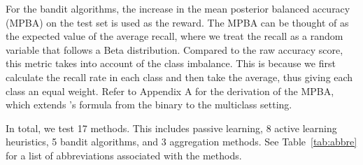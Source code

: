 \documentclass[fleqn,10pt,lineno]{wlpeerj} %
\begin{document}
For the bandit algorithms, the increase in the mean posterior balanced accuracy
(MPBA) on the test set is used as the reward. The MPBA can be thought of as the
expected value of the average recall, where we treat the recall as a random
variable that follows a Beta distribution. Compared to the raw accuracy score,
this metric takes into account of the class imbalance. This is because we first
calculate the recall rate in each class and then take the average, thus giving
each class an equal weight. Refer to Appendix A for the derivation of the MPBA,
which extends \cite{brodersen10}'s formula from the binary to the multiclass
setting.

In total, we test 17 methods. This includes passive learning, 8 active learning
heuristics, 5 bandit algorithms, and 3 aggregation methods. See
Table~\ref{tab:abbre} for a list of abbreviations associated with the methods.
\end{document}
